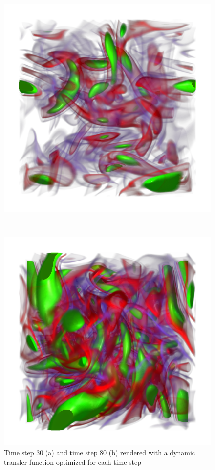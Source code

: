 \begin{figure}
	\centering
	\begin{minipage}{.49\textwidth}
		\includegraphics[width=1\linewidth]{images/vorts30_optimized_parallelsearch}
		\subcaption{}
	\end{minipage}~
	\begin{minipage}{.49\textwidth}
		\includegraphics[width=1\linewidth]{images/vorts80_optimized_parallelsearch}
		\subcaption{}
	\end{minipage}
	\caption{Time step 30 (a) and time step 80 (b) rendered with a dynamic transfer function optimized for each time step}
	\label{fig:vorts_50_80_dynamic}
\end{figure}

